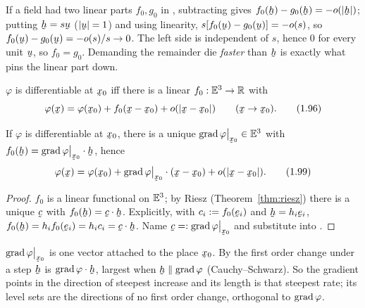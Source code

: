 \begin{remark}\label{rem:kills}
If a field had two linear parts $f_0,g_0$ in , subtracting gives
$f_0(\bh)-g_0(\bh)=-o(|\bh|)$; putting $\bh=s\bu$ ($|\bu|=1$) and using
linearity, $s[f_0(\bu)-g_0(\bu)]=-o(s)$, so
$f_0(\bu)-g_0(\bu)=-o(s)/s\to0$. The left side is independent of $s$, hence
$0$ for every unit $\bu$, so $f_0=g_0$. Demanding the remainder die
\emph{faster} than $\bh$ is exactly what pins the linear part down.
\end{remark}

\begin{definition}\label{def:diff}
$\varphi$ is differentiable at $\bx_0$ iff there is a linear
$f_0:\mathbb{E}^{3}\to\mathbb{R}$ with
\begin{equation}
\varphi(\bx)=\varphi(\bx_0)+f_0(\bx-\bx_0)+o(|\bx-\bx_0|)\qquad(\bx\to\bx_0).
\tag{1.96}\label{eq:1.96}
\end{equation}
\end{definition}

\begin{theorem}\label{thm:grad}
If $\varphi$ is differentiable at $\bx_0$, there is a unique
$\grad\varphi\rest{\bx_0}\in\Et$ with
$f_0(\bh)=\grad\varphi\rest{\bx_0}\cdot\bh$, hence
\begin{equation}
\varphi(\bx)=\varphi(\bx_0)+\grad\varphi\rest{\bx_0}\cdot(\bx-\bx_0)
+o(|\bx-\bx_0|). \tag{1.99}\label{eq:1.99}
\end{equation}
\end{theorem}

\begin{proof}
$f_0$ is a linear functional on $\mathbb{E}^{3}$; by Riesz (Theorem~\ref{thm:riesz})
there is a unique $\bc$ with $f_0(\bh)=\ip\bc\bh$. Explicitly, with
$c_i:=f_0(\be_i)$ and $\bh=h_i\be_i$,
$f_0(\bh)=h_if_0(\be_i)=h_ic_i=\ip\bc\bh$. Name
$\bc=:\grad\varphi\rest{\bx_0}$ and substitute into .
\end{proof}

\begin{remark}\label{rem:slope}
$\grad\varphi\rest{\bx_0}$ is one vector attached to the place $\bx_0$. By
 the first order change under a step $\bh$ is
$\grad\varphi\cdot\bh$, largest when $\bh\parallel\grad\varphi$
(Cauchy--Schwarz). So the gradient points in the direction of steepest
increase and its length is that steepest rate; its level sets are the
directions of no first order change, orthogonal to $\operatorname{grad}\varphi$.
\end{remark}

